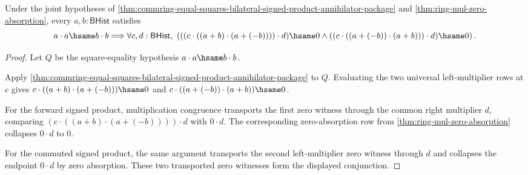\begin{theorem}
\label{thm:commring-equal-squares-bilateral-signed-product-context-annihilator}
Under the joint hypotheses of
\autoref{thm:commring-equal-squares-bilateral-signed-product-annihilator-package}
and \autoref{thm:ring-mul-zero-absorption}, every $a,b : \mathsf{BHist}$ satisfies
$$
a\cdot a\hsame b\cdot b
\Longrightarrow
\forall c,d : \mathsf{BHist},\
\left(
((c\cdot((a+b)\cdot(a+(-b))))\cdot d)\hsame0
\land
((c\cdot((a+(-b))\cdot(a+b)))\cdot d)\hsame0
\right).
$$
\end{theorem}
\begin{proof}
Let $Q$ be the square-equality hypothesis $a\cdot a\hsame b\cdot b$.

Apply
\autoref{thm:commring-equal-squares-bilateral-signed-product-annihilator-package}
to $Q$. Evaluating the two universal left-multiplier rows at $c$ gives
$c\cdot((a+b)\cdot(a+(-b)))\hsame0$ and
$c\cdot((a+(-b))\cdot(a+b))\hsame0$.

For the forward signed product, multiplication congruence transports the
first zero witness through the common right multiplier $d$, comparing
$(c\cdot((a+b)\cdot(a+(-b))))\cdot d$ with $0\cdot d$. The corresponding
zero-absorption row from \autoref{thm:ring-mul-zero-absorption} collapses
$0\cdot d$ to $0$.

For the commuted signed product, the same argument transports the second
left-multiplier zero witness through $d$ and collapses the endpoint
$0\cdot d$ by zero absorption. These two transported zero witnesses form the
displayed conjunction.
\end{proof}

